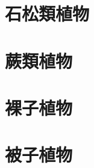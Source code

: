 \begin{flushleft}
    \begin{multicols}{2}
    \linespread{1}\selectfont
    \section{石松類植物}
    
    \section{蕨類植物}
    
    \section{裸子植物}
    
    \section{被子植物}
    
    \end{multicols}
\end{flushleft}
